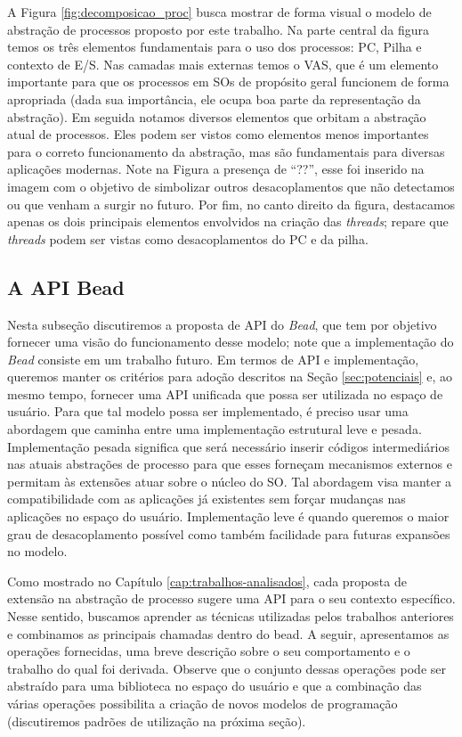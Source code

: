 A Figura \ref{fig:decomposicao_proc} busca mostrar de forma visual o modelo de
abstração de processos proposto por este trabalho. Na parte central da figura
temos os três elementos fundamentais para o uso dos processos: PC, Pilha e
contexto de E/S. Nas camadas mais externas temos o VAS, que é um elemento
importante para que os processos em SOs de propósito geral funcionem de forma
apropriada (dada sua importância, ele ocupa boa parte da representação da
abstração).  Em seguida notamos diversos elementos que orbitam a abstração
atual de processos. Eles podem ser vistos como elementos menos importantes para
o correto funcionamento da abstração, mas são fundamentais para diversas
aplicações modernas. Note na Figura a presença de ``??'', esse foi inserido na
imagem com o objetivo de simbolizar outros desacoplamentos que não detectamos
ou que venham a surgir no futuro. Por fim, no canto direito da figura,
destacamos apenas os dois principais elementos envolvidos na criação das
\emph{threads}; repare que \emph{threads} podem ser vistas como desacoplamentos
do PC e da pilha.

\subsection{A API Bead}
\label{sec:api}

Nesta subseção discutiremos a proposta de API do \emph{Bead}, que tem por
objetivo fornecer uma visão do funcionamento desse modelo; note que a
implementação do \emph{Bead} consiste em um trabalho futuro. Em termos de API e
implementação, queremos manter os critérios para adoção descritos na Seção
\ref{sec:potenciais} e, ao mesmo tempo, fornecer uma API unificada que possa
ser utilizada no espaço de usuário. Para que tal modelo possa ser implementado,
é preciso usar uma abordagem que caminha entre uma implementação estrutural
leve e pesada.  Implementação pesada significa que será necessário inserir
códigos intermediários nas atuais abstrações de processo para que esses
forneçam mecanismos externos e permitam às extensões atuar sobre o núcleo do
SO. Tal abordagem visa manter a compatibilidade com as aplicações já existentes
sem forçar mudanças nas aplicações no espaço do usuário. Implementação leve é
quando queremos o maior grau de desacoplamento possível como também facilidade
para futuras expansões no modelo.

Como mostrado no Capítulo \ref{cap:trabalhos-analisados}, cada proposta de
extensão na abstração de processo sugere uma API para o seu contexto
específico. Nesse sentido, buscamos aprender as técnicas utilizadas pelos
trabalhos anteriores e combinamos as principais chamadas dentro do bead. A
seguir, apresentamos as operações fornecidas, uma breve descrição sobre o seu
comportamento e o trabalho do qual foi derivada. Observe que o conjunto dessas
operações pode ser abstraído para uma biblioteca no espaço do usuário e que a
combinação das várias operações possibilita a criação de novos modelos de
programação (discutiremos padrões de utilização na próxima seção). 

